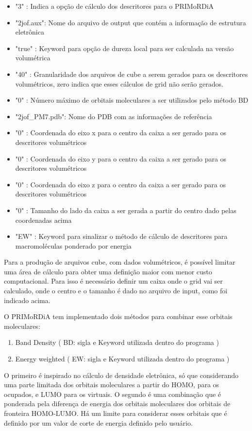 \documentclass[a4paper,11pt]{refart}
\begin{document}
\begin{itemize}
	\item "3" : Indica a opção de cálculo dos descritores para o PRIMoRDiA
	\item "2jof.aux": Nome do arquivo de output que contém a informação de estrutura eletrônica
	\item "true" : Keyword para opção de dureza local para ser calculada na versão volumétrica
	\item "40" : Granularidade dos arquivos de cube a serem gerados para os descritores volumétricos, zero indica que esses cálculos de grid não serão gerados.
	\item "0" : Número máximo de orbitais moleculares a ser utilizados pelo método BD
	\item "2jof\_PM7.pdb": Nome do PDB com as informações de referência
	\item "0" : Coordenada do eixo x para o centro da caixa a ser gerado para os descritores volumétricos
	\item "0" : Coordenada do eixo y para o centro da caixa a ser gerado para os descritores volumétricos
	\item "0" : Coordenada do eixo z para o centro da caixa a ser gerado para os descritores volumétricos
	\item "0" : Tamanho do lado da caixa a ser gerada a partir do centro dado pelas coordenadas acima
	\item "EW" : Keyword para sinalizar o método de cálculo de descritores para macromoléculas ponderado por energia
\end{itemize}

Para a produção de arquivos cube, com dados volumétricos, é possível limitar uma área de cálculo para obter uma definição maior com menor custo computacional. Para isso é necessário definir um caixa onde o grid vai ser calculado, onde o centro e o tamanho é dado no arquivo de input, como foi indicado acima.

O PRIMoRDiA tem implementado dois métodos para combinar esse orbitais moleculares:

\begin{enumerate}
	\item Band Density ( BD: sigla e Keyword utilizada dentro do programa )
	\item Energy weighted ( EW: sigla e Keyword utilizada dentro do programa )
\end{enumerate}

O primeiro é inspirado no cálculo de densidade eletrônica, só que considerando uma parte limitada dos orbitais moleculares a partir do HOMO, para os ocupados, e LUMO para os virtuais. O segundo é uma combinação que é ponderada pela diferença de energia dos orbitais moleculares dos orbitais de fronteira HOMO-LUMO. Há um limite para considerar esses orbitais que é definido por um valor de corte de energia definido pelo usuário.
\end{document}
